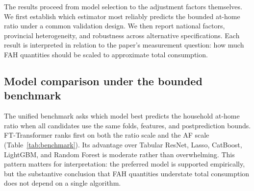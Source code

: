 \documentclass[preprint,12pt,authoryear]{elsarticle}
\begin{document}
The results proceed from model selection to the adjustment factors themselves. We first establish which estimator most reliably predicts the bounded at-home ratio under a common validation design. We then report national factors, provincial heterogeneity, and robustness across alternative specifications. Each result is interpreted in relation to the paper's measurement question: how much FAH quantities should be scaled to approximate total consumption.

\subsection{Model comparison under the bounded benchmark}
\label{subsec:benchmark}

The unified benchmark asks which model best predicts the household at-home ratio when all candidates use the same folds, features, and postprediction bounds. FT-Transformer ranks first on both the ratio scale and the AF scale (Table~\ref{tab:benchmark}). Its advantage over Tabular ResNet, Lasso, CatBoost, LightGBM, and Random Forest is moderate rather than overwhelming. This pattern matters for interpretation: the preferred model is supported empirically, but the substantive conclusion that FAH quantities understate total consumption does not depend on a single algorithm.
\end{document}
